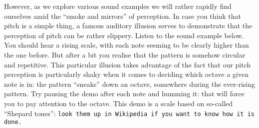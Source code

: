   However, as we explore various sound examples we will rather rapidly find 
  ourselves amid the ``smoke and mirrors'' of perception. In case you think 
  that pitch is a simple thing, a famous auditory illusion serves to 
  demonstrate that the perception of pitch can be rather slippery. Listen to 
  the sound example below. You should hear a rising scale, with each note 
  seeming to be clearly higher than the one before. But after a bit you realise 
  that the pattern is somehow circular and repetitive. This particular illusion 
  takes advantage of the fact that our pitch perception is particularly shaky 
  when it comes to deciding which octave a given note is in: the pattern 
  ``sneaks'' down an octave, somewhere during the ever-rising pattern. Try 
  pausing the demo after each note and humming it: that will force you to pay 
  attention to the octave. This demo is a scale based on so-called ``Shepard 
  tones'': \tt{}look them up in Wikipedia\rm{} if you want to know how it is 
  done. 

